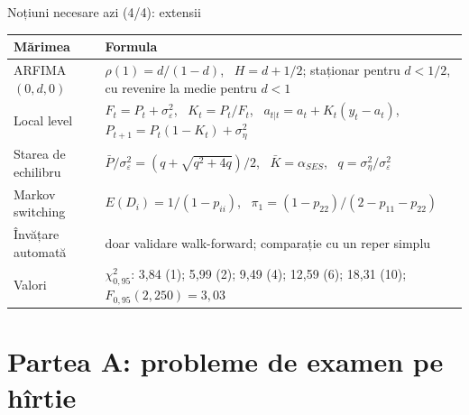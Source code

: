 \begin{frame}{Noțiuni necesare azi (4/4): extensii}
\itemsize{\small}
{\renewcommand{\arraystretch}{1.3}\begin{center}
\footnotesize
\begin{tabular}{l>{\raggedright\arraybackslash}p{9.4cm}}
\toprule
\textbf{Mărimea} & \textbf{Formula} \\
\midrule
ARFIMA$(0,d,0)$ & $\rho(1) = d/(1 - d)$, \ $H = d + 1/2$; staționar pentru $d < 1/2$, cu revenire la medie pentru $d < 1$ \\
Local level & $F_t = P_t + \sigma^2_\varepsilon$, \ $K_t = P_t/F_t$, \ $a_{t|t} = a_t + K_t(y_t - a_t)$, \ $P_{t+1} = P_t(1 - K_t) + \sigma^2_\eta$ \\
Starea de echilibru & $\bar P/\sigma^2_\varepsilon = (q + \sqrt{q^2 + 4q})/2$, \ $\bar K = \alpha_{SES}$, \ $q = \sigma^2_\eta/\sigma^2_\varepsilon$ \\
Markov switching & $E(D_i) = 1/(1 - p_{ii})$, \ $\pi_1 = (1 - p_{22})/(2 - p_{11} - p_{22})$ \\
Învățare automată & doar validare walk-forward; comparație cu un reper simplu \\
Valori & $\chi^2_{0{,}95}$: 3,84 (1); 5,99 (2); 9,49 (4); 12,59 (6); 18,31 (10); \ $F_{0{,}95}(2, 250) = 3{,}03$ \\
\bottomrule
\end{tabular}
\end{center}
}
\end{frame}


\section{Partea A: probleme de examen pe hîrtie}

